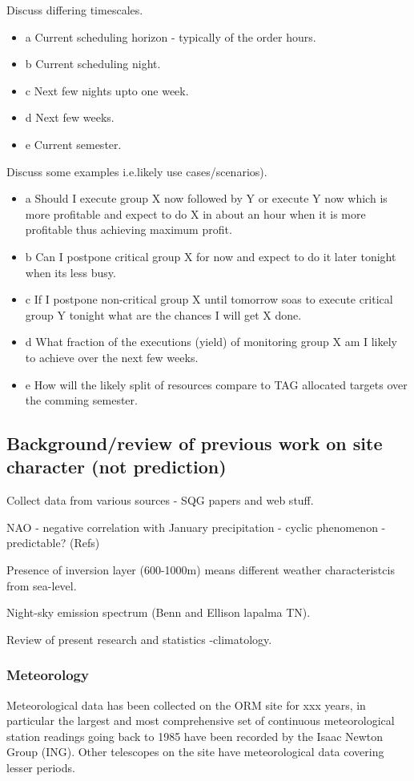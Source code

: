 Discuss differing timescales.
\begin{itemize}
\item a Current scheduling horizon - typically of the order hours.
\item b Current scheduling night.
\item c Next few nights upto one week.
\item d Next few weeks.
\item e Current semester.
\end{itemize}

Discuss some examples i.e.likely use cases/scenarios).
\begin{itemize}
\item a Should I execute group X now followed by Y or execute Y now which is more profitable and expect to do X in about an hour when it is more profitable thus achieving maximum profit.
\item b Can I postpone critical group X for now and expect to do it later tonight when its less busy.
\item c If I postpone non-critical group X until tomorrow soas to execute critical group Y tonight what are the chances I will get X done.
\item d What fraction of the executions (yield) of monitoring group X am I likely to achieve over the next few weeks.
\item e How will the likely split of resources compare to TAG allocated targets over the comming semester.
\end{itemize}

\subsection{Background/review of previous work on site character (not prediction)}
Collect data from various sources - SQG papers and web stuff.

NAO - negative correlation with January precipitation - cyclic phenomenon - predictable? (Refs)

Presence of inversion layer (600-1000m) means different weather characteristcis from sea-level.

Night-sky emission spectrum (Benn and Ellison lapalma TN).

Review of present research and statistics -climatology.

\subsubsection{Meteorology}
Meteorological data has been collected on the ORM site for xxx years, in particular the largest and most comprehensive set of continuous meteorological station readings going back to 1985 have been recorded by the Isaac Newton Group (ING). Other telescopes on the site have meteorological data covering lesser periods. 

